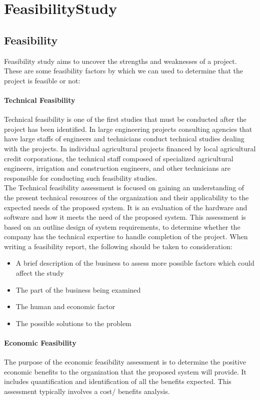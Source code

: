 \chapter{FeasibilityStudy}

\section{Feasibility}
Feasibility study aims to uncover the strengths and weaknesses of
a project. These are some feasibility factors by which we can used to determine that the project is feasible or not:
	\subsubsection{Technical Feasibility}
Technical feasibility is one of the first studies that must be conducted after the project has been identified. In large engineering projects consulting agencies that have large staffs of engineers and technicians conduct technical studies dealing with the projects. In individual agricultural projects financed by local agricultural credit corporations, the technical staff composed of specialized agricultural engineers, irrigation and construction engineers, and other technicians are responsible for conducting such feasibility studies.\\ The Technical feasibility assessment is focused on gaining an understanding of the present technical resources of the organization and their applicability to the expected needs of the proposed system. It is an evaluation of the hardware and software and how it meets the need of the proposed system. This assessment is based on an outline design of system requirements, to determine whether the company has the technical expertise to handle completion of the project. When writing a feasibility report, the following should be taken to consideration:
\begin{itemize}
	\item A brief description of the business to assess more possible factors which could affect the study
	\item The part of the business being examined
	\item The human and economic factor
	\item The possible solutions to the problem
\end{itemize}
 \subsubsection{Economic Feasibility}
The purpose of the economic feasibility assessment is to determine the positive economic benefits to the organization that the proposed system will provide. It includes quantification and identification of all the benefits expected. This assessment typically involves a cost/ benefits analysis.\\

